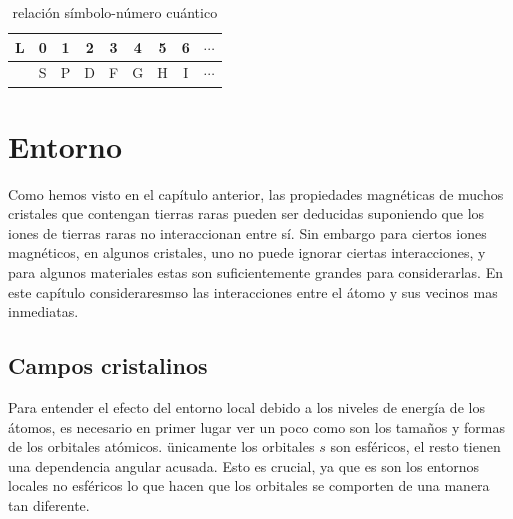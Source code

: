 \documentclass[12pt,a4paper]{book}
\numberwithin{equation}{section}
\numberwithin{figure}{section}
\begin{document}
\begin{table}[h!] 
    \centering
    \begin{tabular}{c|cccccccc}
       L  & 0 & 1 & 2 & 3 & 4 & 5 & 6 & $ \cdots $  \\ \hline
          & S & P & D & F & G & H & I & $ \cdots $ 
    \end{tabular}
    \caption{relación símbolo-número cuántico}
    \label{Tab:02-05-01}
\end{table}






\newpage

\chapter{Entorno}

Como hemos visto en el capítulo anterior, las propiedades magnéticas de muchos cristales que contengan tierras raras pueden ser deducidas suponiendo que los iones de tierras raras no interaccionan entre sí. Sin embargo para ciertos iones magnéticos, en algunos cristales, uno no puede ignorar ciertas interacciones, y para algunos materiales estas son suficientemente grandes para considerarlas. En este capítulo consideraresmso las interacciones entre el átomo y sus vecinos mas inmediatas. \\

\section{Campos cristalinos}

Para entender el efecto del entorno local debido a los niveles de energía de los átomos, es necesario en primer lugar ver un poco como son los tamaños y formas de los orbitales atómicos. ünicamente los orbitales $s$ son esféricos, el resto tienen una dependencia angular acusada. Esto es crucial, ya que es son los entornos locales no esféricos lo que hacen que los orbitales se comporten de una manera tan diferente.
\end{document}
